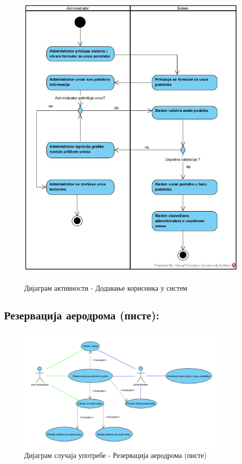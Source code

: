 \documentclass{article}
\begin{document}
\begin{figure}[H]
    \centering
    \includegraphics[width=1.1\textwidth, height=15cm]{Dijagrami_slike/dodavanje_korisnika.jpg}
    \caption{Дијаграм активности - Додавање корисника у систем}
\end{figure}

\subsection{Резервација аеродрома (писте):}

\begin{figure}[h!]
    \centering
    \includegraphics[width=0.9\textwidth]{Dijagrami_slike/ucs_rezervacija_aerodroma.png}
    \caption{Дијаграм случаја употребе - Резервација аеродрома (писте)}
\end{figure}
\end{document}
